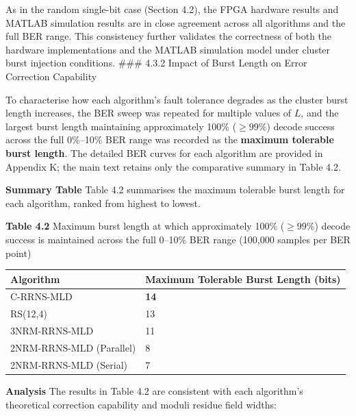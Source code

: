 As in the random single-bit case (Section 4.2), the FPGA hardware
results and MATLAB simulation results are in close agreement across all
algorithms and the full BER range. This consistency further validates
the correctness of both the hardware implementations and the MATLAB
simulation model under cluster burst injection conditions. \#\#\# 4.3.2
Impact of Burst Length on Error Correction Capability

To characterise how each algorithm's fault tolerance degrades as the
cluster burst length increases, the BER sweep was repeated for multiple
values of \(L\), and the largest burst length maintaining approximately
100\% (\(\geq 99\%\)) decode success across the full 0\%--10\% BER range
was recorded as the \textbf{maximum tolerable burst length}. The
detailed BER curves for each algorithm are provided in Appendix K; the
main text retains only the comparative summary in Table 4.2.

\textbf{Summary Table} Table 4.2 summarises the maximum tolerable burst
length for each algorithm, ranked from highest to lowest.

\textbf{Table 4.2} Maximum burst length at which approximately 100\%
(\(\geq 99\%\)) decode success is maintained across the full 0--10\% BER
range (100,000 samples per BER point)

{\def\LTcaptype{none} %
\begin{longtable}[]{@{}ll@{}}
\toprule\noalign{}
Algorithm & Maximum Tolerable Burst Length (bits) \\
\midrule\noalign{}
\endhead
\bottomrule\noalign{}
\endlastfoot
C-RRNS-MLD & \textbf{14} \\
RS(12,4) & 13 \\
3NRM-RRNS-MLD & 11 \\
2NRM-RRNS-MLD (Parallel) & 8 \\
2NRM-RRNS-MLD (Serial) & 7 \\
\end{longtable}
}

\textbf{Analysis} The results in Table 4.2 are consistent with each
algorithm's theoretical correction capability and moduli residue field
widths:

